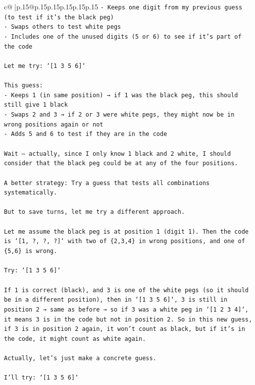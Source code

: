 \documentclass{article}
\begin{document}
{\begin{supertabular}{c@{$\;$}|p{.15\linewidth}@{}p{.15\linewidth}p{.15\linewidth}p{.15\linewidth}p{.15\linewidth}p{.15\linewidth}}
{{{\texttt{{-} Keeps one digit from my previous guess (to test if it's the black peg)} \\
\texttt{{-} Swaps others to test white pegs} \\
\texttt{{-} Includes one of the unused digits (5 or 6) to see if it's part of the code} \\
\\ 
\texttt{Let me try: `{[}1 3 5 6{]}`} \\
\\ 
\texttt{This guess:} \\
\texttt{{-} Keeps 1 (in same position) → if 1 was the black peg, this should still give 1 black} \\
\texttt{{-} Swaps 2 and 3 → if 2 or 3 were white pegs, they might now be in wrong positions again or not} \\
\texttt{{-} Adds 5 and 6 to test if they are in the code} \\
\\ 
\texttt{Wait — actually, since I only know 1 black and 2 white, I should consider that the black peg could be at any of the four positions.} \\
\\ 
\texttt{A better strategy: Try a guess that tests all combinations systematically.} \\
\\ 
\texttt{But to save turns, let me try a different approach.} \\
\\ 
\texttt{Let me assume the black peg is at position 1 (digit 1). Then the code is `{[}1, ?, ?, ?{]}` with two of \{2,3,4\} in wrong positions, and one of \{5,6\} is wrong.} \\
\\ 
\texttt{Try: `{[}1 3 5 6{]}`} \\
\\ 
\texttt{If 1 is correct (black), and 3 is one of the white pegs (so it should be in a different position), then in `{[}1 3 5 6{]}`, 3 is still in position 2 → same as before → so if 3 was a white peg in `{[}1 2 3 4{]}`, it means 3 is in the code but not in position 2. So in this new guess, if 3 is in position 2 again, it won't count as black, but if it's in the code, it might count as white again.} \\
\\ 
\texttt{Actually, let's just make a concrete guess.} \\
\\ 
\texttt{I'll try: `{[}1 3 5 6{]}`} \\
}}}
\end{supertabular}}
\end{document}
